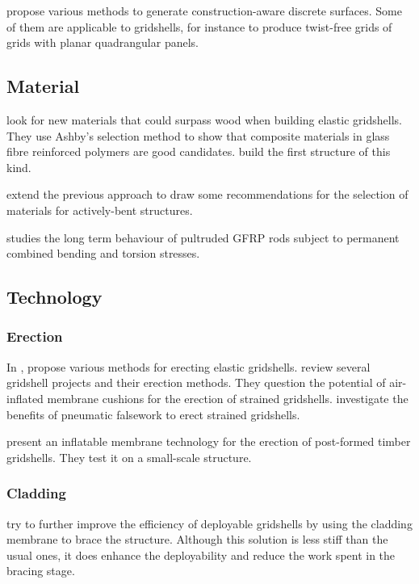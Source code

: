  propose various methods to generate construction-aware discrete surfaces. Some of them are applicable to gridshells, for instance to produce twist-free grids of grids with planar quadrangular panels.

\subsection{Material}

 look for new materials that could surpass wood when building elastic gridshells. They use Ashby's selection method to show that composite materials in glass fibre reinforced polymers are good candidates.  build the first structure of this kind.

 extend the previous approach to draw some recommendations for the selection of materials for actively-bent structures.

 studies the long term behaviour of pultruded GFRP rods subject to permanent combined bending and torsion stresses.

\subsection{Technology}

\subsubsection{Erection}
In ,  propose various methods for erecting elastic gridshells.
 review several gridshell projects and their erection methods. They question the potential of air-inflated membrane cushions for the erection of strained gridshells.  investigate the benefits of pneumatic falsework to erect strained gridshells.

 present an inflatable membrane technology for the erection of post-formed timber gridshells. They test it on a small-scale structure.

\subsubsection{Cladding}
 try to further improve the efficiency of deployable gridshells by using the cladding membrane to brace the structure. Although this solution is less stiff than the usual ones, it does enhance the deployability and reduce the work spent in the bracing stage.

